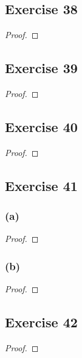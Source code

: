 \documentclass[14pt]{extarticle}
\begin{document}
\subsection{Exercise 38}

\begin{proof}

\end{proof}

\subsection{Exercise 39}

\begin{proof}

\end{proof}

\subsection{Exercise 40}

\begin{proof}

\end{proof}

\subsection{Exercise 41}

\subsubsection{(a)}

\begin{proof}

\end{proof}

\subsubsection{(b)}

\begin{proof}

\end{proof}

\subsection{Exercise 42}

\begin{proof}

\end{proof}
\end{document}

